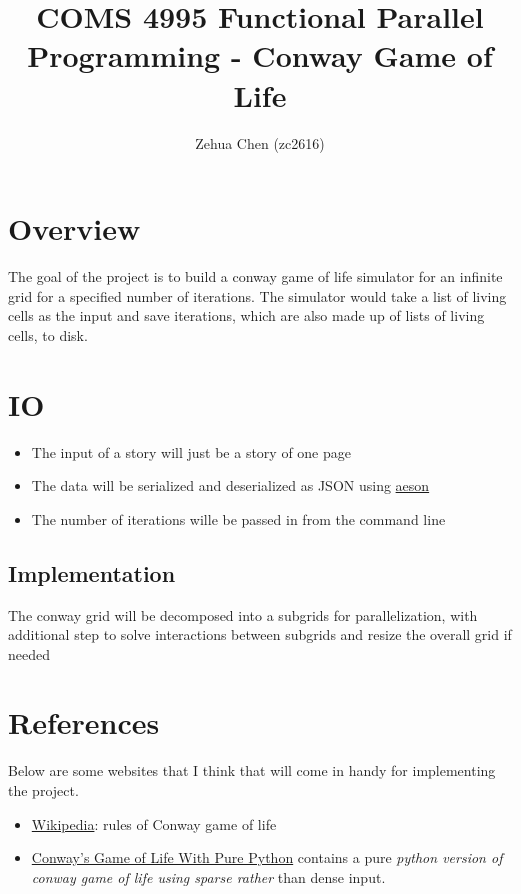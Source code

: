 \documentclass{article}
\title{COMS 4995 Functional Parallel Programming - Conway Game of Life}
\author{Zehua Chen (zc2616)}
\begin{document}
  \maketitle

  \section{Overview}

    The goal of the project is to build a conway game of life simulator for
    an infinite grid for a specified number of iterations. The simulator would
    take a list of living cells as the input and save iterations, which are
    also made up of lists of living cells, to disk.

  \section{IO}

    

    \begin{itemize}
      \item The input of a story will just be a story of one page
      \item The data will be serialized and deserialized as JSON using
      \href{https://hackage.haskell.org/package/aeson}{aeson}
      \item The number of iterations wille be passed in from the command line
    \end{itemize}

  \subsection{Implementation}

    The conway grid will be decomposed into a subgrids for parallelization, with
    additional step to solve interactions between subgrids and resize the overall grid
    if needed

  \section{References}

    Below are some websites that I think that will come in handy for implementing
    the project.

    \begin{itemize}
      \item \href{https://en.wikipedia.org/wiki/Conway%27s_Game_of_Life}{Wikipedia}:
      rules of Conway game of life
      \item \href{https://www.madelyneriksen.com/python-game-of-life}{Conway's Game of Life With Pure Python}
      contains a pure \emph{python version of conway game of life using sparse rather}
      than dense input.
    \end{itemize}
\end{document}
